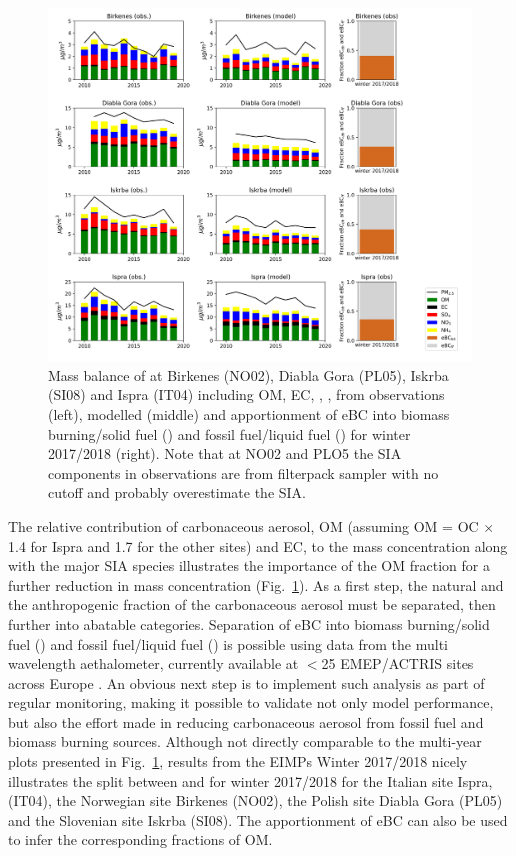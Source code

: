 \begin{figure}
\includegraphics[width=16cm]{FIGS_TRENDS/Composition_4sites.png}
 \caption{
  Mass balance of \pmfine at  Birkenes (NO02), Diabla Gora
  (PL05), Iskrba (SI08) and Ispra (IT04) including OM, EC, , ,  from 
  observations (left), modelled (middle) and apportionment of eBC
  into biomass burning/solid fuel (\EBCff) and fossil fuel/liquid fuel
  (\EBCbb) for winter 2017/2018 (right). Note that at NO02 and PLO5 the SIA components in observations are from filterpack sampler with no cutoff and probably overestimate the \pmfine SIA. \label{fig:KEX4}
 }
\end{figure}


The relative contribution of carbonaceous aerosol, OM (assuming OM = OC $\times$
1.4 for Ispra and 1.7 for the other sites)
 and EC, to the \pmfine mass concentration along with the major
SIA species illustrates the importance of the OM fraction for a further
reduction in \pmfine mass concentration (Fig.~\ref{fig:KEX4}). As a first step,
the natural and the anthropogenic fraction of the carbonaceous aerosol
must be separated, then further into abatable categories. Separation of
eBC into biomass burning/solid fuel (\EBCbb) and fossil fuel/liquid fuel
(\EBCff) is possible using data from the multi wavelength aethalometer,
currently available at $<$25 EMEP/ACTRIS sites across Europe \citep{Yttri:2014,Platt:2020a,Platt:2020b,Platt20XX}. An obvious next
step is to implement such analysis as part of regular monitoring,
making it possible to validate not only model performance, but also the
effort made in reducing carbonaceous aerosol from fossil fuel and biomass
burning sources. Although not directly comparable to the multi-year plots
presented in Fig.~\ref{fig:KEX4}, results from the EIMPs Winter 2017/2018 nicely
illustrates the split between \EBCbb and \EBCff for winter 2017/2018 for
the Italian site Ispra, (IT04), the Norwegian site Birkenes (NO02), the
Polish site Diabla Gora (PL05) and the Slovenian site Iskrba (SI08). The
apportionment of eBC can also be used to infer the corresponding fractions
of OM.

